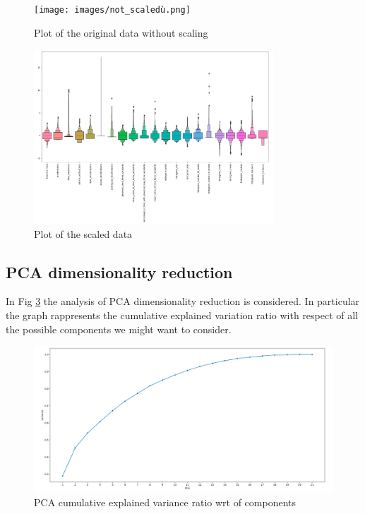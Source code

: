 \documentclass[a4paper,12pt]{article}
\begin{document}
\begin{figure}[H]
  \begin{center}
  \texttt{[image: images/not\_scaledù.png]}
  \end{center}
  \caption{Plot of the original data without scaling}
  \label{fig:notscaled}
\end{figure}

\begin{figure}[H]
  \begin{center}
  \includegraphics[width=0.8\textwidth]{images/scaled.png}
  \end{center}
  \caption{Plot of the scaled data}
  \label{fig:scaled}
\end{figure}

\newpage
\subsection{PCA dimensionality reduction}
\bigbreak
\noindent In Fig \ref{fig:pca} the analysis of PCA dimensionality reduction is considered. In particular the graph rappresents the cumulative explained variation ratio with respect of all the possible components we might want to consider.

\begin{figure}[H]
  \begin{center}
  \includegraphics[width=1.0\textwidth]{images/pca.png}
  \end{center}
  \caption{PCA cumulative explained variance ratio wrt of components}
  \label{fig:pca}
\end{figure}
\end{document}
